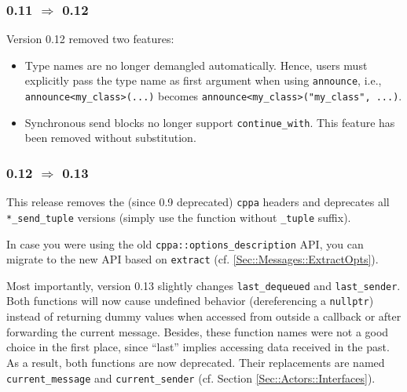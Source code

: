\clearpage
\subsubsection{0.11 $\Rightarrow$ 0.12}

Version 0.12 removed two features:

\begin{itemize}
\item
Type names are no longer demangled automatically.
Hence, users must explicitly pass the type name as first argument when using \lstinline^announce^, i.e., \lstinline^announce<my_class>(...)^ becomes \lstinline^announce<my_class>("my_class", ...)^.

\item
Synchronous send blocks no longer support \lstinline^continue_with^.
This feature has been removed without substitution.
\end{itemize}

\subsubsection{0.12 $\Rightarrow$ 0.13}

This release removes the (since 0.9 deprecated) \lstinline^cppa^ headers and deprecates all \lstinline^*_send_tuple^ versions (simply use the function without \lstinline^_tuple^ suffix).

In case you were using the old \lstinline^cppa::options_description^ API, you can migrate to the new API based on \lstinline^extract^ (cf. \ref{Sec::Messages::ExtractOpts}).

Most importantly, version 0.13 slightly changes \lstinline^last_dequeued^ and \lstinline^last_sender^.
Both functions will now cause undefined behavior (dereferencing a \lstinline^nullptr^) instead of returning dummy values when accessed from outside a callback or after forwarding the current message.
Besides, these function names were not a good choice in the first place, since ``last'' implies accessing data received in the past.
As a result, both functions are now deprecated.
Their replacements are named \lstinline^current_message^ and \lstinline^current_sender^ (cf. Section \ref{Sec::Actors::Interfaces}).


